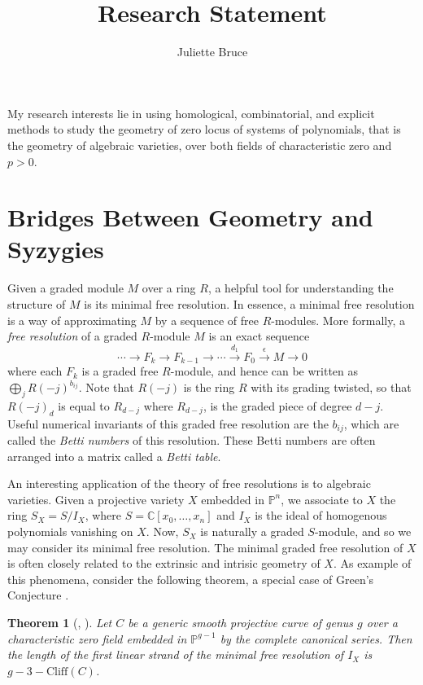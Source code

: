 \documentclass[10pt,reqno]{amsart}
\title{Research Statement}
\author{Juliette Bruce}
\newtheorem{theorem}[lemma]{Theorem}
\theoremstyle{remark}
\newcommand{\C}{\mathbb{C}}
\renewcommand{\P}{\mathbb{P}}
\begin{document}
 

\maketitle



\setcounter{section}{1}

My research interests lie in using homological, combinatorial, and explicit methods to study the geometry of zero locus of systems of polynomials, that is the geometry of algebraic varieties, over both fields of characteristic zero and $p>0$. 

\section{Bridges Between Geometry and Syzygies}

Given a graded module $M$ over a ring $R$, a helpful tool for understanding the structure of $M$ is its minimal free resolution. In essence, a minimal free resolution is a way of approximating $M$ by a sequence of free $R$-modules. More formally, a \textit{free resolution} of a graded $R$-module $M$ is an exact sequence 
\[
\cdots \xrightarrow{} F_{k} \xrightarrow{} F_{k-1} \xrightarrow{} \cdots \xrightarrow{d_{1}} F_{0}\xrightarrow{\epsilon}M\xrightarrow{} 0
\]
where each $F_{k}$ is a graded free $R$-module, and hence can be written as $\bigoplus_{j}R(-j)^{b_{ij}}$. Note that $R(-j)$ is the ring $R$ with its grading twisted, so that $R(-j)_{d}$ is equal to $R_{d-j}$ where $R_{d-j}$, is the graded piece of degree $d-j$. Useful numerical invariants of this graded free resolution are the $b_{ij}$, which are called the \textit{Betti numbers} of this resolution. These Betti numbers are often arranged into a matrix called a \textit{Betti table}.

An interesting application of the theory of free resolutions is to algebraic varieties. Given a projective variety $X$ embedded in $\P^n$, we associate to $X$ the ring $S_X=S/I_X$, where $S=\C[x_0,\ldots,x_n]$ and $I_X$ is the ideal of homogenous polynomials vanishing on $X$. Now, $S_X$ is naturally a graded $S$-module, and so we may consider its minimal free resolution. The minimal graded free resolution of $X$ is often closely related to the extrinsic and intrisic geometry of $X$.  As example of this phenomena, consider the following theorem, a special case of Green's Conjecture \cite{avramov_lectutres_2011}. 

\begin{theorem}[\cite{voisin_greens_2002}, \cite{voisin_greens_2005}]
Let $C$ be a generic smooth projective curve of genus $g$ over a characteristic zero field embedded in $\P^{g-1}$ by the complete canonical series. Then the length of the first linear strand of the minimal free resolution of $I_X$ is $g-3-\text{Cliff}(C)$.
\end{theorem}
\end{document}
